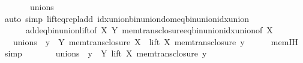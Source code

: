 \begin{isabellebody}
\ \ \ \ {\isacharparenleft}{\kern0pt}\ {\isachardoublequoteopen}{\isacharunderscore}{\kern0pt}\ {\isacharequal}{\kern0pt}\ {\isacharquery}{\kern0pt}unions\ {\isasymunion}\ {\isacharunderscore}{\kern0pt}{\isachardoublequoteclose}{\isacharparenright}{\kern0pt}\isanewline
\ \ \ \ \isamarkupfalse%
\ {\isacharparenleft}{\kern0pt}auto\ simp{\isacharcolon}{\kern0pt}\ lift{\isacharunderscore}{\kern0pt}eq{\isacharunderscore}{\kern0pt}repl{\isacharunderscore}{\kern0pt}add\ idx{\isacharunderscore}{\kern0pt}union{\isacharunderscore}{\kern0pt}bin{\isacharunderscore}{\kern0pt}union{\isacharunderscore}{\kern0pt}dom{\isacharunderscore}{\kern0pt}eq{\isacharunderscore}{\kern0pt}bin{\isacharunderscore}{\kern0pt}union{\isacharunderscore}{\kern0pt}idx{\isacharunderscore}{\kern0pt}union\isanewline
\ \ \ \ \ \ add{\isacharunderscore}{\kern0pt}eq{\isacharunderscore}{\kern0pt}bin{\isacharunderscore}{\kern0pt}union{\isacharunderscore}{\kern0pt}lift{\isacharbrackleft}{\kern0pt}of\ X\ Y{\isacharbrackright}{\kern0pt}\ mem{\isacharunderscore}{\kern0pt}trans{\isacharunderscore}{\kern0pt}closure{\isacharunderscore}{\kern0pt}eq{\isacharunderscore}{\kern0pt}bin{\isacharunderscore}{\kern0pt}union{\isacharunderscore}{\kern0pt}idx{\isacharunderscore}{\kern0pt}union{\isacharbrackleft}{\kern0pt}of\ X{\isacharbrackright}{\kern0pt}{\isacharparenright}{\kern0pt}\isanewline
\ \ \isamarkupfalse%
\ \isamarkupfalse%
\ {\isachardoublequoteopen}{\isachardot}{\kern0pt}{\isachardot}{\kern0pt}{\isachardot}{\kern0pt}\ {\isacharequal}{\kern0pt}\ {\isacharquery}{\kern0pt}unions\ {\isasymunion}\ {\isacharparenleft}{\kern0pt}{\isasymUnion}y\ {\isasymin}\ Y{\isachardot}{\kern0pt}\ mem{\isacharunderscore}{\kern0pt}trans{\isacharunderscore}{\kern0pt}closure\ X\ {\isasymunion}\ lift\ X\ {\isacharparenleft}{\kern0pt}mem{\isacharunderscore}{\kern0pt}trans{\isacharunderscore}{\kern0pt}closure\ y{\isacharparenright}{\kern0pt}{\isacharparenright}{\kern0pt}{\isachardoublequoteclose}\isanewline
\ \ \ \ \isamarkupfalse%
\ mem{\isachardot}{\kern0pt}IH\ \isamarkupfalse%
\ simp\isanewline
\ \ \isamarkupfalse%
\ \isamarkupfalse%
\ {\isachardoublequoteopen}{\isachardot}{\kern0pt}{\isachardot}{\kern0pt}{\isachardot}{\kern0pt}\ {\isacharequal}{\kern0pt}\ {\isacharquery}{\kern0pt}unions\ {\isasymunion}\ {\isacharparenleft}{\kern0pt}{\isasymUnion}y\ {\isasymin}\ Y{\isachardot}{\kern0pt}\ lift\ X\ {\isacharparenleft}{\kern0pt}mem{\isacharunderscore}{\kern0pt}trans{\isacharunderscore}{\kern0pt}closure\ y{\isacharparenright}{\kern0pt}{\isacharparenright}{\kern0pt}{\isachardoublequoteclose}\ \isamarkupfalse%

\end{isabellebody}
